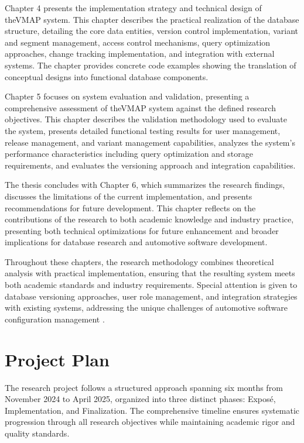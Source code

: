 Chapter 4 presents the implementation strategy and technical design of the\ac{VMAP} system. This chapter describes the practical realization of the database structure, detailing the core data entities, version control implementation, variant and segment management, access control mechanisms, query optimization approaches, change tracking implementation, and integration with external systems. The chapter provides concrete code examples showing the translation of conceptual designs into functional database components.

Chapter 5 focuses on system evaluation and validation, presenting a comprehensive assessment of the\ac{VMAP} system against the defined research objectives. This chapter describes the validation methodology used to evaluate the system, presents detailed functional testing results for user management, release management, and variant management capabilities, analyzes the system's performance characteristics including query optimization and storage requirements, and evaluates the versioning approach and integration capabilities.

The thesis concludes with Chapter 6, which summarizes the research findings, discusses the limitations of the current implementation, and presents recommendations for future development. This chapter reflects on the contributions of the research to both academic knowledge and industry practice, presenting both technical optimizations for future enhancement and broader implications for database research and automotive software development.

Throughout these chapters, the research methodology combines theoretical analysis with practical implementation, ensuring that the resulting system meets both academic standards and industry requirements. Special attention is given to database versioning approaches, user role management, and integration strategies with existing systems, addressing the unique challenges of automotive software configuration management \cite{staron2021automotive}.

\section{Project Plan}

The research project follows a structured approach spanning six months from November 2024 to April 2025, organized into three distinct phases: Exposé, Implementation, and Finalization. The comprehensive timeline ensures systematic progression through all research objectives while maintaining academic rigor and quality standards.

